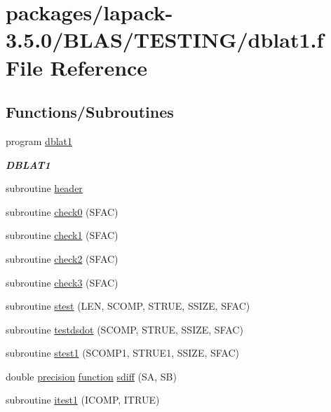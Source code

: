 \hypertarget{dblat1_8f}{}\section{packages/lapack-\/3.5.0/\+B\+L\+A\+S/\+T\+E\+S\+T\+I\+N\+G/dblat1.f File Reference}
\label{dblat1_8f}
\subsection*{Functions/\+Subroutines}
\begin{DoxyCompactItemize}
\item 
program \hyperlink{group__double__blas__testing_ga39e559692fad240e74460f5a8b42a3e0}{dblat1}
\begin{DoxyCompactList}\small\item\em {\bfseries D\+B\+L\+A\+T1} \end{DoxyCompactList}\item 
subroutine \hyperlink{dblat1_8f_a410931b600854e6dd3e253731606117e}{header}
\item 
subroutine \hyperlink{dblat1_8f_a6b8b27d47ac5950cd0325a24b2b37954}{check0} (S\+F\+A\+C)
\item 
subroutine \hyperlink{dblat1_8f_a87cda69493417357e26ad280bc547317}{check1} (S\+F\+A\+C)
\item 
subroutine \hyperlink{dblat1_8f_a9ff9298afee60deb7ffaea43a6d1b668}{check2} (S\+F\+A\+C)
\item 
subroutine \hyperlink{dblat1_8f_a011668799647094e60c6a7c2ad859b65}{check3} (S\+F\+A\+C)
\item 
subroutine \hyperlink{dblat1_8f_a077aa8449e1055cdecdebf7cb41738a5}{stest} (L\+E\+N, S\+C\+O\+M\+P, S\+T\+R\+U\+E, S\+S\+I\+Z\+E, S\+F\+A\+C)
\item 
subroutine \hyperlink{dblat1_8f_a6719c32d9e66d57d9546c40ef88e3b9e}{testdsdot} (S\+C\+O\+M\+P, S\+T\+R\+U\+E, S\+S\+I\+Z\+E, S\+F\+A\+C)
\item 
subroutine \hyperlink{dblat1_8f_ab395702962b4ce31a8b18ae8c74d7f97}{stest1} (S\+C\+O\+M\+P1, S\+T\+R\+U\+E1, S\+S\+I\+Z\+E, S\+F\+A\+C)
\item 
double \hyperlink{numinquire_8h_a2c8e616467665d0b2814d4c1589ba74e}{precision} \hyperlink{afunc_8m_a7b5e596df91eadea6c537c0825e894a7}{function} \hyperlink{dblat1_8f_a094d00ddd2399699d62da4f0f6f83834}{sdiff} (S\+A, S\+B)
\item 
subroutine \hyperlink{dblat1_8f_af82694537a350a6cb3615ece843dcede}{itest1} (I\+C\+O\+M\+P, I\+T\+R\+U\+E)
\end{DoxyCompactItemize}


